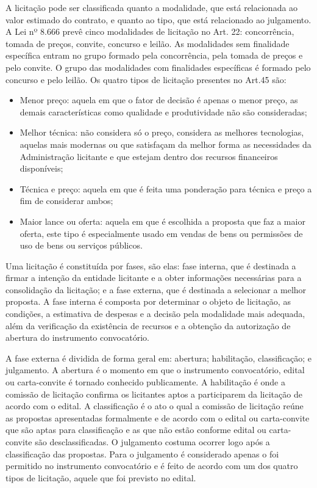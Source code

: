 A licitação pode ser classificada quanto a modalidade, que está relacionada ao valor estimado do contrato, e quanto ao tipo, que está relacionado ao julgamento. A Lei nº 8.666 prevê cinco modalidades de licitação no Art. 22: concorrência, tomada de preços, convite, concurso e leilão. As modalidades sem finalidade específica entram no grupo formado pela concorrência, pela tomada de preços e pelo convite. O grupo das modalidades com finalidades específicas é formado pelo concurso e pelo leilão. Os quatro tipos de licitação presentes no Art.45 são: 
\begin{itemize}
\item Menor preço: aquela em que o fator de decisão é apenas o menor preço, as demais características como qualidade e produtividade não são consideradas;
\item Melhor técnica: não considera só o preço, considera as melhores tecnologias, aquelas mais modernas ou que satisfaçam da melhor forma as necessidades da Administração licitante e que estejam dentro dos recursos financeiros disponíveis;
\item Técnica e preço: aquela em que é feita uma ponderação para técnica e preço a fim de considerar ambos;
\item Maior lance ou oferta: aquela em que é escolhida a proposta que faz a maior oferta, este tipo é especialmente usado em vendas de bens ou permissões de uso de bens ou serviços públicos.
\end{itemize}

Uma licitação é constituída por fases, são elas: fase interna, que é destinada a firmar a intenção da entidade licitante e a obter informações necessárias para a consolidação da licitação; e a fase externa, que é destinada a selecionar a melhor proposta. A fase interna é composta por determinar o objeto de licitação, as condições, a estimativa de despesas e a decisão pela modalidade mais adequada, além da verificação da existência de recursos e a obtenção da autorização de abertura do instrumento convocatório.

A fase externa é dividida de forma geral em: abertura; habilitação, classificação; e julgamento.  A abertura é o momento em que o instrumento convocatório, edital ou carta-convite é tornado conhecido publicamente. A habilitação é onde a comissão de licitação confirma os licitantes aptos a participarem da licitação de acordo com o edital. A classificação é o ato o qual a comissão de licitação reúne as propostas apresentadas formalmente e de acordo com o edital ou carta-convite que são aptas para classificação e as que não estão conforme edital ou carta-convite são desclassificadas. O julgamento costuma ocorrer logo após a classificação das propostas. Para o julgamento é considerado apenas o foi permitido no instrumento convocatório e é feito de acordo com um dos quatro tipos de licitação, aquele que foi previsto no edital. 

